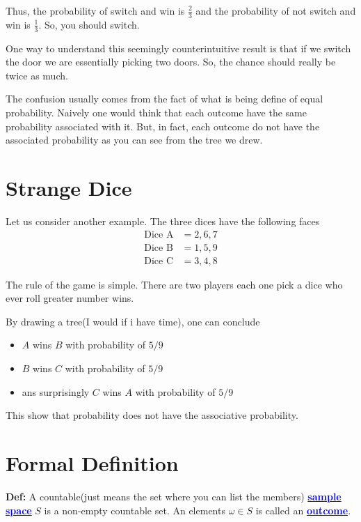 \documentclass[a4paper, 12pt]{article}
\newcommand{\definition}{\vspace{1em}\noindent\textbf{Def:} }
\newcommand{\kwd}[1]{\textcolor{blue}{\textbf{\underline{#1}}}}
\begin{document}
\begin{multicols}{2}

Thus, the probability of switch and win is $\displaystyle \frac{2}{3}$ and the probability of not switch and win is $\displaystyle \frac{1}{3}$. So, you should switch.

One way to understand this seemingly counterintuitive result is that if we switch the door we are essentially picking two doors. So, the chance should really be twice as much.

The confusion usually comes from the fact of what is being define of equal probability. Naively one would think that each outcome have the same probability associated with it. But, in fact, each outcome do not have the associated probability as you can see from the tree we drew.
\section*{Strange Dice}

Let us consider another example. The three dices have the following faces
\begin{align*}
	\text{Dice A} &= {2,6,7}\\
	\text{Dice B} &= {1,5,9}\\
	\text{Dice C} &= {3,4,8}
\end{align*}

The rule of the game is simple. There are two players each one pick a dice who ever roll greater number wins.

By drawing a tree(I would if i have time), one can conclude
\begin{itemize}
	\item $A$ wins $B$ with probability of $5/9$
	\item $B$ wins $C$ with probability of $5/9$
	\item ans surprisingly $C$ wins $A$ with probability of $5/9$
\end{itemize}

This show that probability does not have the associative probability.


\section*{Formal Definition}

\definition A countable(just means the set where you can list the members) \kwd{sample space} $S$ is a non-empty countable set. An elements $\omega \in S$ is called an \kwd{outcome}.


\end{multicols}
\end{document}
